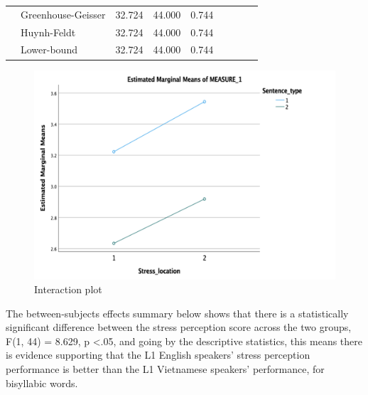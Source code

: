 \documentclass[a4paper]{article}
\begin{document}
\begin{table}[H]
\begin{center}
\begin{tabular}{p{}p{}|l|r|r|r|r|r|}
\cline{2-7}
                                                        & Greenhouse-Geisser & 32.724                            & 44.000                  & 0.744                            & \multicolumn{1}{l|}{~} & \multicolumn{1}{l|}{~}     \\ 
\cline{2-7}
                                                        & Huynh-Feldt        & 32.724                            & 44.000                  & 0.744                            & \multicolumn{1}{l|}{~} & \multicolumn{1}{l|}{~}     \\ 
\cline{2-7}
                                                        & Lower-bound        & 32.724                            & 44.000                  & 0.744                            & \multicolumn{1}{l|}{~} & \multicolumn{1}{l|}{~}     \\
\hline
\end{tabular}
\end{center}
\end{table}


\begin{figure}[H]
\begin{center} 
\includegraphics[scale=0.7]{interactionplot.png} 
\caption{Interaction plot}
\label{fig:interaction2}
\end{center}   
\end{figure}


The between-subjects effects summary below shows that there is a statistically significant difference between the stress perception score across the two groups, F(1, 44) =  8.629, p \textless .05, and going by the descriptive statistics, this means there is evidence supporting that the L1 English speakers' stress perception performance is better than the L1 Vietnamese speakers' performance, for bisyllabic words.
\end{document}
